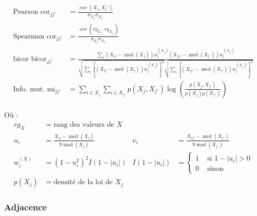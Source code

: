 \begin{align} 
    \text{Pearson  } \operatorname{cor}_{jj'} & = \frac{\operatorname{cov}(X_j,X_j')}{\sigma_{X_{j}} \sigma_{X_{j'}}} \label{simscore_base_pearson} \\
    \text{Spearman  } \operatorname{cor}_{jj'} & = \frac{\operatorname{cov}(rg_{X_j},rg_{X_{j'}})}{\sigma_{X_j}\sigma_{X_{j'}}} \label{simscore_base_spearman} \\
    \text{bicor  } \operatorname{bicor}_{jj'} & = \frac{\underset{i}{\sum}\left(X_{ij}-\operatorname{med}(X_j)\right) w_{i}^{(X_{j})}\left(X_{ij'}-\operatorname{med}(X_{j'})\right) w_{i}^{(X_{j'})}}{\sqrt{\underset{i}{\sum}\left[\left(X_{ij}-\operatorname{med}(X_{j})\right) w_{i}^{(X_j)}\right]^{2}} \sqrt{\underset{i}{\sum}\left[\left(X_{ij'}-\operatorname{med}(X_{j'})\right) w_{i}^{(X_{j'})}\right]^{2}}} \label{simscore_base_bicor} \\
    \text{Info. mut.  } \operatorname{mi}_{jj'} & = \sum_{i \in X_{j}} \sum_{i \in X_{j'}} p(X_j, X_{j'}) \log \left(\frac{p(X_j, X_{j'})}{p(X_j) p(X_{j'})}\right) \label{simscore_base_mi} 
\end{align} \\
Où :
\begin{align*}
    rg_X &= \text{rang des valeurs de } X \\
    u_{i} &=\frac{X_{ij}-\operatorname{med}(X_{j})}{9 \operatorname{mad}(X_{j})}   &
    v_{i} &=\frac{X_{ij'}-\operatorname{med}(X_{j'})}{9 \operatorname{mad}(X_{j'})} \\    
    w_{i}^{(X)} &= \left(1-u_{i}^{2}\right)^{2} I\left(1-\left|u_{i}\right|\right)   &
    I\left(1-\left|u_{i}\right|\right) &= \begin{cases}1 & \text{ si } 1-\left|u_{i}\right| > 0 \\ 0 & \text{ sinon}\end{cases} \\ 
    p(X_j) & = \text{densité de la loi de } X_j
\end{align*}


\subsubsection{Adjacence}

